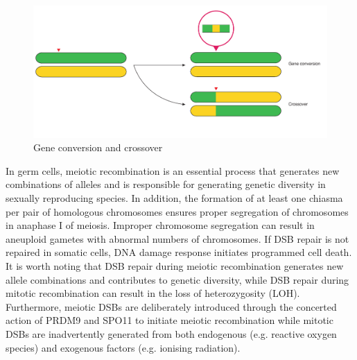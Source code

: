 \begin{figure}[htbp!]
\caption{Gene conversion and crossover}
\label{figure:homologous-recombination}
\begin{centering}
\includegraphics[width=\textwidth]{meiotic_recombination.pdf}
\end{centering}
\end{figure}

In germ cells, meiotic recombination is an essential process that generates new combinations of alleles and is responsible for generating genetic diversity in sexually reproducing species. In addition, the formation of at least one chiasma per pair of homologous chromosomes ensures proper segregation of chromosomes in anaphase I of meiosis. Improper chromosome segregation can result in aneuploid gametes with abnormal numbers of chromosomes. If DSB repair is not repaired in somatic cells, DNA damage response initiates programmed cell death. It is worth noting that DSB repair during meiotic recombination generates new allele combinations and contributes to genetic diversity, while DSB repair during mitotic recombination can result in the loss of heterozygosity (LOH). Furthermore, meiotic DSBs are deliberately introduced through the concerted action of PRDM9 and SPO11 to initiate meiotic recombination while mitotic DSBs are inadvertently generated from both endogenous (e.g. reactive oxygen species) and exogenous factors (e.g. ionising radiation).

